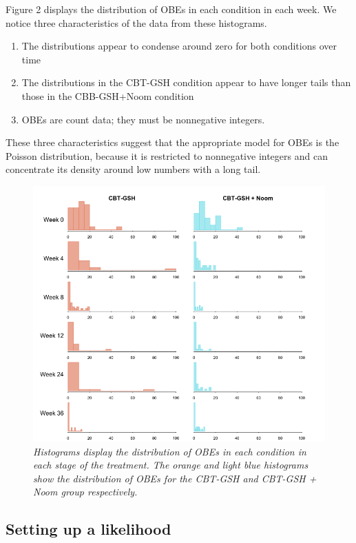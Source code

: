 \documentclass{article}
\begin{document}
%
Figure 2 displays the distribution of OBEs in each condition in each week.  We notice three characteristics of the data from these histograms.
\begin{enumerate}
\item{The distributions appear to condense around zero for both conditions over time} 
\item{The distributions in the CBT-GSH condition appear to have longer tails than those in the CBB-GSH+Noom condition}
\item{OBEs are count data; they must be nonnegative integers.}
\end{enumerate}
These three characteristics suggest that the appropriate model for OBEs is the Poisson distribution, because it is restricted to nonnegative integers and can concentrate its density around low numbers with a long tail.
%
\begin{figure}[H]
\begin{center}
\includegraphics[width=\textwidth, height=\textheight, keepaspectratio]{noom_hist.png}
\end{center}
\caption{\emph{Histograms display the distribution of OBEs in each condition in each stage of the treatment. The orange and light blue histograms show the distribution of OBEs for the CBT-GSH and CBT-GSH  + Noom group respectively.}}
\end{figure}
%
\subsection*{Setting up a likelihood}
\end{document}
